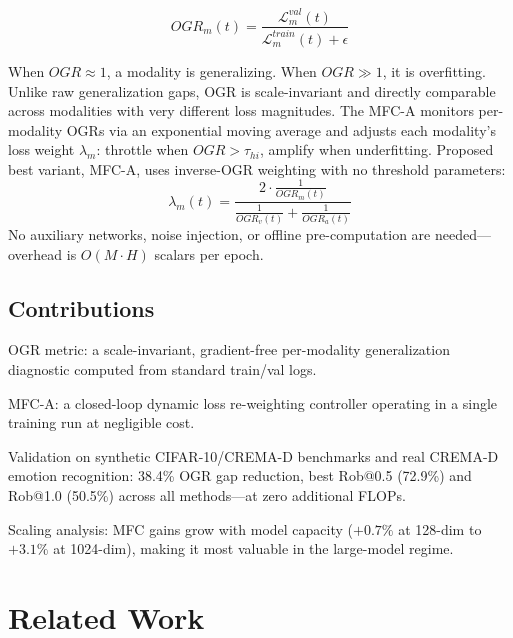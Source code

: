 \documentclass[preprint,a4paper, 10pt, 5p]{elsarticle}
\begin{document}
\begin{equation}
    OGR_m(t) = \frac{\mathcal{L}^{val}_m(t)}{\mathcal{L}^{train}_m(t) + \epsilon}
\end{equation}

When $OGR \approx 1$, a modality is generalizing. When $OGR \gg 1$, it is overfitting. Unlike raw generalization gaps, OGR is scale-invariant and directly comparable across modalities with very different loss magnitudes. The MFC-A monitors per-modality OGRs via an exponential moving average and adjusts each modality's loss weight $\lambda_m$: throttle when $OGR > \tau_{hi}$, amplify when underfitting.
Proposed best variant, MFC-A, uses inverse-OGR weighting with no threshold parameters:
\begin{equation}
      \lambda_m(t) = \frac{2 \cdot \frac{1}{OGR_m(t)}}{\frac{1}{OGR_v(t)} + \frac{1}{OGR_a(t)}}
  \end{equation}
No auxiliary networks, noise injection, or offline pre-computation are needed---overhead is $O(M \cdot H)$ scalars per epoch.

\subsection*{Contributions}
OGR metric: a scale-invariant, gradient-free per-modality generalization diagnostic computed from standard train/val logs.

MFC-A: a closed-loop dynamic loss re-weighting controller operating in a single training run at negligible cost.

Validation on synthetic CIFAR-10/CREMA-D benchmarks and real CREMA-D emotion recognition: 38.4\% OGR gap reduction, best Rob@0.5 (72.9\%) and Rob@1.0 (50.5\%) across all methods---at zero additional FLOPs.

Scaling analysis: MFC gains grow with model capacity ($+0.7\%$ at 128-dim to $+3.1\%$ at 1024-dim), making it most valuable in the large-model regime.

\section{Related Work}
\end{document}

